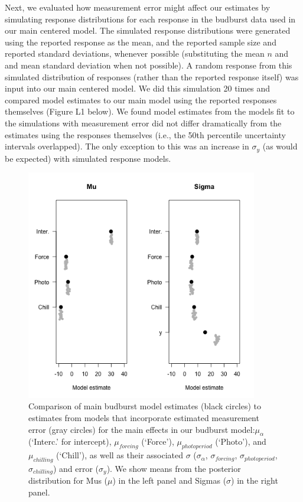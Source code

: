 \documentclass{article}
\begin{document}
{Next, we evaluated how measurement error might affect our estimates by simulating response distributions for each response in the budburst data used in our main centered model. The simulated response distributions were generated using the reported response as the mean, and the reported sample size and reported standard deviations, whenever possible (substituting the mean $n$ and and mean standard deviation when not possible). A random response from this simulated distribution of responses (rather than the reported response itself) was input into our main centered model. We did this simulation 20 times and compared model estimates to our main model using the reported responses themselves (Figure L1 below). We found model estimates from the models fit to the simulations with measurement error did not differ dramatically from the estimates using the responses themselves (i.e., the 50th percentile uncertainty intervals overlapped). The only exception to this was an increase in $\sigma_{y}$ (as would be expected) with simulated response models.\\
\begin{figure}[p]
\centering
\noindent \includegraphics[width=0.9\textwidth]{..//..//..//..//analyses/bb_analysis/figures/measerrcomp.png}
\caption{Comparison of main budburst model estimates (black circles) to estimates from models that incorporate estimated measurement error (gray circles) for the main effects in our budburst model:$\mu_{\alpha}$ (`Interc.' for intercept), $\mu_{forcing}$ (`Force'), $\mu_{photoperiod}$ (`Photo'), and $\mu_{chilling}$ (`Chill'), as well as their associated $\sigma$ ($\sigma_{\alpha}$, $\sigma_{forcing}$, $\sigma_{photoperiod}$,$\sigma_{chilling}$) and error ($\sigma_{y}$). We show means from the posterior distribution for Mus ($\mu$) in the left panel and Sigmas ($\sigma$) in the right panel.}
\label{fig:measerr}
\end{figure}


}
\end{document}
